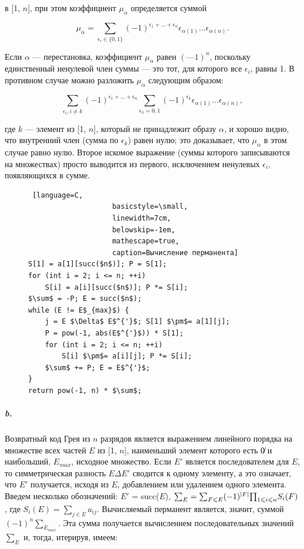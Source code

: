 \documentclass{../../template/mai_book}
\DeclarePairedDelimiter{\abs}{\lvert}{\rvert}
\begin{document}

\noindent
[1, $n$] в [1, $n$], при этом коэффициент $\mu_\alpha$ определяется суммой

\begin{equation*}
\mu_{\alpha} = \sum_{\epsilon_i\in\{0,1\}} (-1)^{\epsilon_1+...+\epsilon_n} \epsilon_{\alpha(1)}...\epsilon_{\alpha(n)}.
\end{equation*}

\noindent
Если $\alpha$ — перестановка, коэффициент $\mu_\alpha$ равен $(—1)^n$, поскольку единственный ненулевой член суммы — это тот, для которого все $\epsilon_i$, равны 1. В противном случае можно разложить $\mu_\alpha$ следующим образом:

\begin{equation*}
\sum_{\epsilon_i, i \neq k} (-1)^{\epsilon_1+...+\epsilon_n} \sum_{\epsilon_k=0,1} (-1)^{\epsilon_k} \epsilon_{\alpha(1)}...\epsilon_{\alpha(n)},
\end{equation*}

\noindent
где $k$ — элемент из [1, $n$], который не принадлежит образу $\alpha$, и хорошо видно, что внутренний член (сумма по $\epsilon_k$) равен нулю; это доказывает, что $\mu_\alpha$ в этом случае равно нулю. Второе искомое выражение (суммы которого записываются на множествах) просто выводится из первого, исключением ненулевых $\epsilon_i$, появляющихся в сумме.

\setcounter{lstlisting}{11}

\begin{figure}
\begin{lstlisting} [language=C,
					basicstyle=\small,
					linewidth=7cm, 
					belowskip=-1em,
					mathescape=true, 
					caption=Вычисление перманента]
S[1] = a[1][succ($n$)]; P = S[1];
for (int i = 2; i <= n; ++i)
	S[i] = a[i][succ($n$)]; P *= S[i];
$\sum$ = -P; E = succ($n$);
while (E != E$_{max}$) {
	j = E $\Delta$ E$^{'}$; S[1] $\pm$= a[1][j];
	P = pow(-1, abs(E$^{'}$)) * S[1];
	for (int i = 2; i <= n; ++i)
		S[i] $\pm$= a[i][j]; P *= S[i];
	$\sum$ += P; E = E$^{'}$;
}
return pow(-1, n) * $\sum$;
\end{lstlisting}
\end{figure}

\subparagraph{b.} Возвратный код Грея из $n$ разрядов является выражением линейного порядка на множестве всех частей $E$ из [1, $n$], наименьший элемент которого есть 0̸  и наибольший, $E_{max}$, исходное множество. Если $E'$ является последователем для $E$, то симметрическая разность $E \Delta E'$ сводится к одному элементу, а это означает, что $E'$ получается, исходя из $E$, добавлением или удалением одного элемента. Введем несколько обозначений: $E'$ = succ($E$), ${\sum}_E = {\sum}_{F \leqslant E} (-1)^{\abs{F}} {\prod}_{1 \leqslant i \leqslant n} S_i (F)$, где $S_i (E) = {\sum}_{j \in E} a_{ij}$. Вычисляемый перманент является, значит, суммой $(-1)^n {\sum}_{E_{max}}$. Эта сумма получается вычислением последовательных значений ${\sum}_E$ и, тогда, итерируя, имеем:
\end{document}
